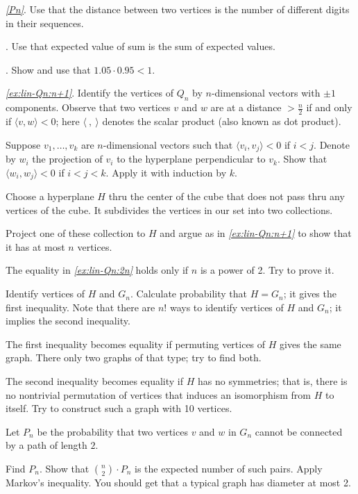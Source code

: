 \parbf{\ref{ex:Qn-dist};} \textit{\ref{Pn}}.
Use that the distance between two vertices is the number of different digits in their sequences.

\parit{\ref{kPn}}. Use that expected value of sum is the sum of expected values. 

\parit{\ref{ex:Qn-dist:end}}. Show and use that $1.05\cdot0.95<1$.

\parbf{\ref{ex:lin-Qn};} \textit{\ref{ex:lin-Qn:n+1}}.
Identify the vertices of $Q_n$ by $n$-dimensional vectors with $\pm1$ components.
Observe that two vertices $v$ and $w$ are at a distance $>\tfrac n2$ if and only if $\langle v,w\rangle <0$;
here $\langle\ ,\ \rangle$ denotes the scalar product (also known as dot product).

Suppose $v_1,\dots,v_k$ are $n$-dimensional vectors such that $\langle v_i,v_j\rangle <0$ if $i< j$.
Denote by $w_i$ the projection of $v_i$ to the hyperplane perpendicular to $v_k$.
Show that $\langle w_i,w_j\rangle <0$ if $i<j<k$.
Apply it with induction by $k$.

\parit{\ref{ex:lin-Qn:2n}}
Choose a hyperplane $H$ thru the center of the cube that does not pass thru any vertices of the cube.
It subdivides the vertices in our set into two collections.

Project one of these collection to $H$ and argue as in \textit{\ref{ex:lin-Qn:n+1}} to show that it has at most $n$ vertices.

The equality in \textit{\ref{ex:lin-Qn:2n}} holds only if $n$ is a power of 2.
Try to prove it.

 Identify vertices of $H$ and $G_n$.
Calculate probability that $H=G_n$; it gives the first inequality.
Note that there are $n!$ ways to identify vertices of $H$ and $G_n$;
it implies the second inequality.

The first inequality becomes equality if permuting vertices of $H$ gives the same graph.
There only two graphs of that type; try to find both.

The second inequality becomes equality if $H$ has no symmetries;
that is, there is no nontrivial permutation of vertices that induces an isomorphism from $H$ to itself.
Try to construct such a graph with 10 vertices.

Let $P_n$ be the probability that two vertices $v$ and $w$ in $G_n$ cannot be connected by a path of length $2$.

Find $P_n$.
Show that $\binom n2\cdot P_n$ is the expected number of such pairs.
Apply Markov's inequality.
You should get that a typical graph has diameter at most 2.

